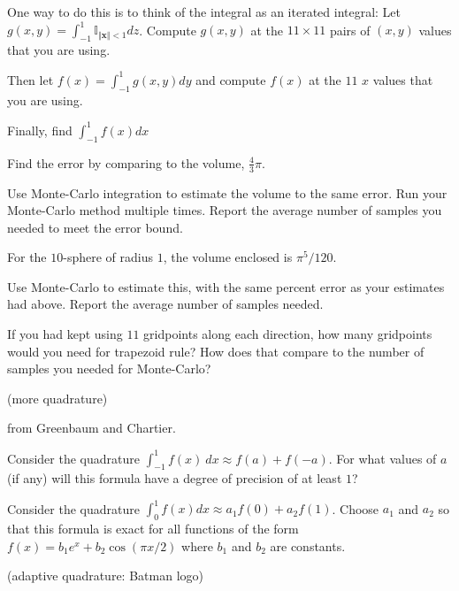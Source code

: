 \documentclass[12pt,letterpaper,noanswers]{exam}
\begin{document}
\begin{questions}
\begin{parts}
One way to do this is to think of the integral as an iterated integral: Let $g(x,y) = \displaystyle\int_{-1}^1 \mathbb{I}_{\Vert \mathbf{x}\Vert <1} dz$.  Compute $g(x,y)$ at the $11\times 11$ pairs of $(x,y)$ values that you are using.

Then let $f(x) = \displaystyle\int_{-1}^1 g(x,y) dy$ and compute $f(x)$ at the $11$ $x$ values that you are using.

Finally, find $\displaystyle\int_{-1}^1 f(x) dx$

Find the error by comparing to the volume, $\frac{4}{3}\pi$.

\item Use Monte-Carlo integration to estimate the volume to the same error.  Run your Monte-Carlo method multiple times.  Report the average number of samples you needed to meet the error bound.

\item For the $10$-sphere of radius $1$, the volume enclosed is $\pi^5/120$.

Use Monte-Carlo to estimate this, with the same percent error as your estimates had above.  Report the average number of samples needed.

\item If you had kept using $11$ gridpoints along each direction, how many gridpoints would you need for trapezoid rule?  How does that compare to the number of samples you needed for Monte-Carlo?


\end{parts}

\question (more quadrature)

from Greenbaum and Chartier.
\begin{parts}
    \item Consider the quadrature $\int_{-1}^1 f(x)\ dx\approx f(a) + f(-a)$.  For what values of $a$ (if any) will this formula have a degree of precision of at least $1$?
    \item Consider the quadrature $\int_0^1 f(x) dx \approx a_1 f(0) + a_2 f(1)$.  Choose $a_1$ and $a_2$ so that this formula is exact for all functions of the form $f(x) = b_1e^x + b_2\cos(\pi x/2)$ where $b_1$ and $b_2$ are constants.
\end{parts}

\item (adaptive quadrature: Batman logo)


\end{questions}
\end{document}
